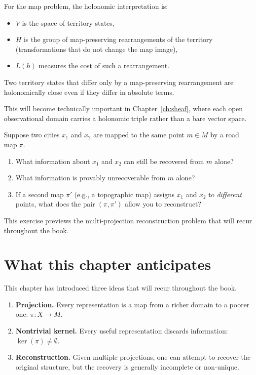 For the map problem, the holonomic interpretation is:
\begin{itemize}[leftmargin=2em]
  \item $V$ is the space of territory states,
  \item $H$ is the group of map-preserving rearrangements of the
    territory (transformations that do not change the map image),
  \item $L(h)$ measures the cost of such a rearrangement.
\end{itemize}
Two territory states that differ only by a map-preserving
rearrangement are holonomically close even if they differ in
absolute terms.

This will become technically important in
Chapter~\ref{ch:sheaf}, where each open observational domain
carries a holonomic triple rather than a bare vector space.

\begin{ReconExercise}
  Suppose two cities $x_1$ and $x_2$ are mapped to the same
  point $m \in M$ by a road map $\pi$.
  \begin{enumerate}[leftmargin=2em]
    \item What information about $x_1$ and $x_2$ can still be
      recovered from $m$ alone?
    \item What information is provably unrecoverable from $m$
      alone?
    \item If a second map $\pi'$ (e.g., a topographic map)
      assigns $x_1$ and $x_2$ to \emph{different} points,
      what does the pair $(\pi, \pi')$ allow you to reconstruct?
  \end{enumerate}
  This exercise previews the multi-projection reconstruction
  problem that will recur throughout the book.
\end{ReconExercise}

\section{What this chapter anticipates}

This chapter has introduced three ideas that will recur
throughout the book.

\begin{enumerate}[leftmargin=2em]
  \item \textbf{Projection.}
    Every representation is a map from a richer domain to a
    poorer one: $\pi : X \to M$.

  \item \textbf{Nontrivial kernel.}
    Every useful representation discards information:
    $\ker(\pi) \neq \emptyset$.

  \item \textbf{Reconstruction.}
    Given multiple projections, one can attempt to recover the
    original structure, but the recovery is generally incomplete
    or non-unique.
\end{enumerate}

